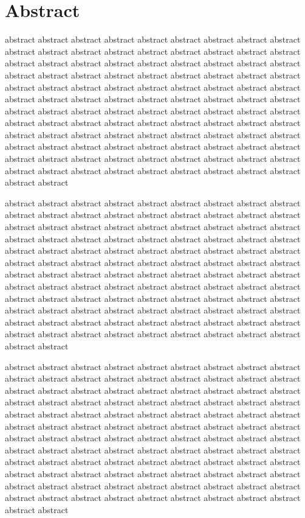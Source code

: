 \documentclass[platex,ja=standard,12pt,a4paper,twoside,onecolumn,fleqn,dvipdfmx,english]{bxjsbook}
\begin{document}
\chapter{Abstract}
abstract abstract abstract abstract abstract abstract abstract abstract abstract abstract abstract abstract abstract abstract abstract abstract abstract abstract abstract abstract abstract abstract abstract abstract abstract abstract abstract abstract abstract abstract abstract abstract abstract abstract abstract abstract abstract abstract abstract abstract abstract abstract abstract abstract abstract abstract abstract abstract abstract abstract abstract abstract abstract abstract abstract abstract abstract abstract abstract abstract abstract abstract abstract abstract abstract abstract abstract abstract abstract abstract abstract abstract abstract abstract abstract abstract abstract abstract abstract abstract abstract abstract abstract abstract abstract abstract abstract abstract abstract abstract abstract abstract abstract abstract abstract abstract abstract abstract abstract abstract abstract abstract abstract abstract abstract abstract abstract abstract abstract abstract

abstract abstract abstract abstract abstract abstract abstract abstract abstract abstract abstract abstract abstract abstract abstract abstract abstract abstract abstract abstract abstract abstract abstract abstract abstract abstract abstract abstract abstract abstract abstract abstract abstract abstract abstract abstract abstract abstract abstract abstract abstract abstract abstract abstract abstract abstract abstract abstract abstract abstract abstract abstract abstract abstract abstract abstract abstract abstract abstract abstract abstract abstract abstract abstract abstract abstract abstract abstract abstract abstract abstract abstract abstract abstract abstract abstract abstract abstract abstract abstract abstract abstract abstract abstract abstract abstract abstract abstract abstract abstract abstract abstract abstract abstract abstract abstract abstract abstract abstract abstract abstract abstract abstract abstract abstract abstract abstract abstract abstract abstract

abstract abstract abstract abstract abstract abstract abstract abstract abstract abstract abstract abstract abstract abstract abstract abstract abstract abstract abstract abstract abstract abstract abstract abstract abstract abstract abstract abstract abstract abstract abstract abstract abstract abstract abstract abstract abstract abstract abstract abstract abstract abstract abstract abstract abstract abstract abstract abstract abstract abstract abstract abstract abstract abstract abstract abstract abstract abstract abstract abstract abstract abstract abstract abstract abstract abstract abstract abstract abstract abstract abstract abstract abstract abstract abstract abstract abstract abstract abstract abstract abstract abstract abstract abstract abstract abstract abstract abstract abstract abstract abstract abstract abstract abstract abstract abstract abstract abstract abstract abstract abstract abstract abstract abstract abstract abstract abstract abstract abstract abstract
\end{document}
